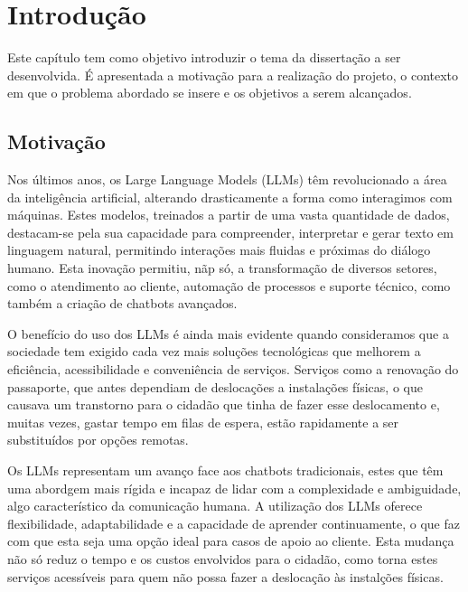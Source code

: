 
%

\chapter{Introdução}
\label{cha:introduction}


\epigraphfontsize{\small\itshape}
\setlength\epigraphwidth{12.5cm}
\setlength\epigraphrule{0pt}

\noindent Este capítulo tem como objetivo introduzir o tema da dissertação a ser desenvolvida. 
É apresentada a motivação para a realização do projeto, o contexto em que o problema abordado se insere e os objetivos a serem alcançados. 

\section{Motivação}
\label{sec:motivation}
Nos últimos anos, os Large Language Models (LLMs) têm revolucionado a área da inteligência artificial, alterando drasticamente a forma como interagimos com máquinas.
Estes modelos, treinados a partir de uma vasta quantidade de dados, destacam-se pela sua capacidade para compreender, interpretar e gerar texto em linguagem natural, permitindo interações mais fluidas e próximas do diálogo humano.
Esta inovação permitiu, nãp só, a transformação de diversos setores, como o atendimento ao cliente, automação de processos e suporte técnico, como também a criação de chatbots avançados. 

O benefício do uso dos LLMs é ainda mais evidente quando consideramos que a sociedade tem exigido cada vez mais soluções tecnológicas que melhorem a eficiência, acessibilidade e conveniência de serviços. 
Serviços como a renovação do passaporte, que antes dependiam de deslocações a instalações físicas, o que causava um transtorno para o cidadão que tinha de fazer esse deslocamento e, muitas vezes, gastar tempo em filas de espera, estão rapidamente a ser substituídos por opções remotas.

Os LLMs representam um avanço face aos chatbots tradicionais, estes que têm uma abordgem mais rígida e incapaz de lidar com a complexidade e ambiguidade, algo característico da comunicação humana. 
A utilização dos LLMs oferece flexibilidade, adaptabilidade e a capacidade de aprender continuamente, o que faz com que esta seja uma opção ideal para casos de apoio ao cliente.
Esta mudança não só reduz o tempo e os custos envolvidos para o cidadão, como torna estes serviços acessíveis para quem não possa fazer a deslocação às instalções físicas.

